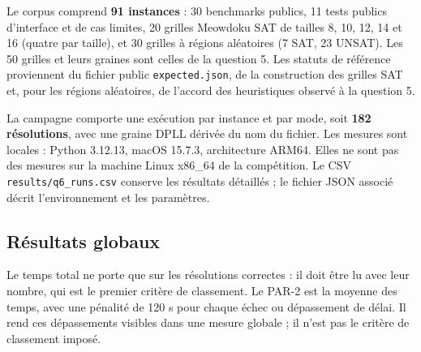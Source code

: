 \documentclass[10pt,a4paper]{article}
\begin{document}
Le corpus comprend \textbf{91 instances} : 30 benchmarks publics,
11 tests publics d'interface et de cas limites, 20 grilles Meowdoku SAT
de tailles 8, 10, 12, 14 et 16 (quatre par taille), et 30 grilles à régions
aléatoires (7 SAT, 23 UNSAT). Les 50 grilles et leurs graines sont celles
de la question 5. Les statuts de référence proviennent du fichier public
\texttt{expected.json}, de la construction des grilles SAT et, pour les
régions aléatoires, de l'accord des heuristiques observé à la question 5.

La campagne comporte une exécution par instance et par mode, soit
\textbf{182 résolutions}, avec une graine DPLL dérivée du nom du fichier.
Les mesures sont locales : Python 3.12.13, macOS 15.7.3, architecture ARM64.
Elles ne sont pas des mesures sur la machine Linux x86\_64 de la compétition.
Le CSV \texttt{results/q6\_runs.csv} conserve les résultats détaillés ; le
fichier JSON associé décrit l'environnement et les paramètres.

\subsection{Résultats globaux}

\begin{center}\small

\end{center}
Le temps total ne porte que sur les résolutions correctes : il doit être
lu avec leur nombre, qui est le premier critère de classement. Le PAR-2
est la moyenne des temps, avec une pénalité de 120 s pour chaque échec
ou dépassement de délai. Il rend ces dépassements visibles dans une
mesure globale ; il n'est pas le critère de classement imposé.



\begin{center}
\end{center}
\end{document}
